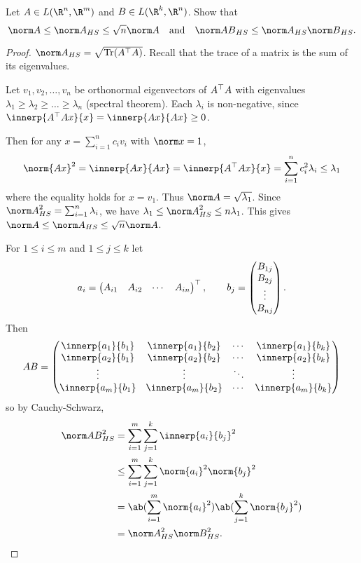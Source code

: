 \documentclass[12pt]{article}
\begin{document}
\begin{problem} \label{prb:operator-hs}
    Let $A \in L(\R^n, \R^m)$ and $B \in L(\R^k, \R^n)$.
    Show that \[
        \norm A \le \hsn A \le \sqrt n \norm A
        \quad \text{and} \quad
        \hsn{AB} \le \hsn A \hsn B.
    \]
\end{problem}
\begin{proof}
    $\hsn A = \sqrt{\Tr(A^\T A)}$.
    Recall that the trace of a matrix is the sum of its eigenvalues.

    Let $v_1, v_2, \dots, v_n$ be orthonormal eigenvectors of $A^\top A$
    with eigenvalues $\lambda_1 \ge \lambda_2 \ge \dots \ge \lambda_n$
    (spectral theorem).
    Each $\lambda_i$ is non-negative, since
    $\innerp{A^\T Ax}{x} = \innerp{Ax}{Ax} \ge 0$.

    Then for any $x = \sum_{i=1}^n c_i v_i$ with $\norm x = 1$, \[
        \norm{Ax}^2 = \innerp{Ax}{Ax} = \innerp{A^\T Ax}{x}
            = \sum_{i=1}^n c_i^2 \lambda_i
            \le \lambda_1
    \] where the equality holds for $x = v_1$.
    Thus $\norm A = \sqrt{\lambda_1}$.
    Since $\hsn A^2 = \sum_{i=1}^n \lambda_i$, we have
    $\lambda_1 \le \hsn A^2 \le n \lambda_1$.
    This gives $\norm A \le \hsn A \le \sqrt n \norm A$.

    For $1 \le i \le m$ and $1 \le j \le k$ let \[
        a_i = \begin{pmatrix}
            A_{i1} & A_{i2} & \cdots & A_{in}
        \end{pmatrix}^\top, \qquad b_j = \begin{pmatrix}
            B_{1j} \\ B_{2j} \\ \vdots \\ B_{nj}
        \end{pmatrix}.
    \] Then \[
        AB = \begin{pmatrix}
            \innerp{a_1}{b_1} & \innerp{a_1}{b_2} & \cdots & \innerp{a_1}{b_k} \\
            \innerp{a_2}{b_1} & \innerp{a_2}{b_2} & \cdots & \innerp{a_2}{b_k} \\
            \vdots & \vdots & \ddots & \vdots \\
            \innerp{a_m}{b_1} & \innerp{a_m}{b_2} & \cdots & \innerp{a_m}{b_k}
        \end{pmatrix}
    \] so by Cauchy-Schwarz, \begin{align*}
        \hsn{AB}^2 &= \sum_{i=1}^m \sum_{j=1}^k \innerp{a_i}{b_j}^2 \\
        &\le \sum_{i=1}^m \sum_{j=1}^k \norm{a_i}^2 \norm{b_j}^2 \\
        &= \ab(\sum_{i=1}^m \norm{a_i}^2) \ab(\sum_{j=1}^k \norm{b_j}^2) \\
        &= \hsn A^2 \hsn B^2. \qedhere
    \end{align*}
\end{proof}
\end{document}
